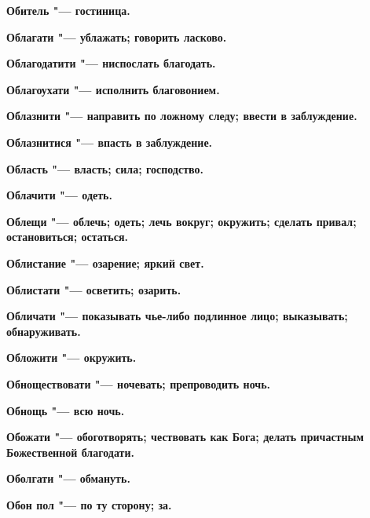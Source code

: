 \begin{mymulticols}{2}
\bfseries Обитель\normalfont{} "--- гостиница. 




\bfseries Облагати\normalfont{} "--- ублажать; говорить ласково. 




\bfseries Облагодатити\normalfont{} "--- ниспослать благодать. 




\bfseries Облагоухати\normalfont{} "--- исполнить благовонием. 




\bfseries Облазнити\normalfont{} "--- направить по ложному следу; ввести в заблуждение. 




\bfseries Облазнитися\normalfont{} "--- впасть в заблуждение. 




\bfseries Область\normalfont{} "--- власть; сила; господство. 




\bfseries Облачити\normalfont{} "--- одеть. 




\bfseries Облещи\normalfont{} "--- облечь; одеть; лечь вокруг; окружить; сделать привал; остановиться; остаться. 




\bfseries Облистание\normalfont{} "--- озарение; яркий свет. 




\bfseries Облистати\normalfont{} "--- осветить; озарить. 




\bfseries Обличати\normalfont{} "--- показывать чье-либо подлинное лицо; выказывать; обнаруживать. 




\bfseries Обложити\normalfont{} "--- окружить. 




\bfseries Обноществовати\normalfont{} "--- ночевать; препроводить ночь. 




\bfseries Обнощь\normalfont{} "--- всю ночь. 




\bfseries Обожати\normalfont{} "--- обоготворять; чествовать как Бога; делать причастным Божественной благодати. 




\bfseries Оболгати\normalfont{} "--- обмануть. 




\bfseries Обон пол\normalfont{} "--- по ту сторону; за. 





\end{mymulticols}
